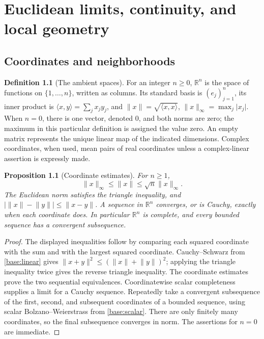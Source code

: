 \documentclass[11pt,oneside,openany]{book}
\newtheorem{proposition}[theorem]{Proposition}
\theoremstyle{definition}
\newtheorem{definition}[theorem]{Definition}
\theoremstyle{remark}
\newcounter{foundation}
\newcommand{\R}{\mathbb R}
\newcommand{\abs}[1]{\lvert#1\rvert}
\newcommand{\norm}[1]{\lVert#1\rVert}
\newcommand{\ip}[2]{\langle#1,#2\rangle}
\newcommand{\family}[1]{}
\begin{document}

\mainmatter

\chapter{Euclidean limits, continuity, and local geometry}
\label{ch:d04-01}

\section{Coordinates and neighborhoods}
\family{K04.01.01}\family{K04.01.02}\family{K04.01.03}\family{K04.01.10}

\begin{definition}[The ambient spaces]\label{d04:01:euclidean}
For an integer $n\geq0$, $\R^n$ is the space of functions on
$\{1,\ldots,n\}$, written as columns. Its standard basis is $(e_j)_{j=1}^n$,
its inner product is $\ip{x}{y}=\sum_jx_jy_j$, and
$\norm{x}=\sqrt{\ip{x}{x}}$, $\norm{x}_\infty=\max_j\abs{x_j}$.
When $n=0$, there is one vector, denoted $0$, and both norms are zero;
the maximum in this particular definition is assigned the value zero.
An empty matrix represents the unique linear map of the indicated dimensions.
Complex coordinates, when used, mean pairs of real coordinates unless a
complex-linear assertion is expressly made.
\end{definition}

\begin{proposition}[Coordinate estimates]\label{d04:01:coordinate-estimates}
For $n\geq1$,
\[
 \norm{x}_\infty\leq\norm{x}\leq\sqrt n\norm{x}_\infty.
\]
The Euclidean norm satisfies the triangle inequality, and
$\abs{\norm{x}-\norm{y}}\leq\norm{x-y}$. A sequence in $\R^n$
converges, or is Cauchy, exactly when each coordinate does. In particular
$\R^n$ is complete, and every bounded sequence has a convergent subsequence.
\end{proposition}
\begin{proof}
The displayed inequalities follow by comparing each squared coordinate with
the sum and with the largest squared coordinate. Cauchy--Schwarz from
\cref{base:linear} gives
$\norm{x+y}^2\leq(\norm{x}+\norm{y})^2$; applying the triangle
inequality twice gives the reverse triangle inequality. The coordinate
estimates prove the two sequential equivalences. Coordinatewise scalar
completeness supplies a limit for a Cauchy sequence. Repeatedly take a
convergent subsequence of the first, second, and subsequent coordinates of a
bounded sequence, using scalar Bolzano--Weierstrass from \cref{base:scalar}.
There are only finitely many coordinates, so the final subsequence converges
in norm. The assertions for $n=0$ are immediate.
\end{proof}
\end{document}
